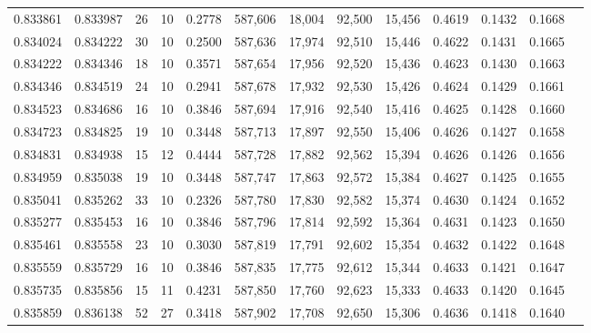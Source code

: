 \begin{tabular}{rrrrrrrrrrrrr}
0.833861 & 0.833987 &    26 &  10 &                                     0.2778 & 587,606 &  18,004 &  92,500 &  15,456 & 0.4619 & 0.1432 & 0.1668 \\
0.834024 & 0.834222 &    30 &  10 &                                     0.2500 & 587,636 &  17,974 &  92,510 &  15,446 & 0.4622 & 0.1431 & 0.1665 \\
0.834222 & 0.834346 &    18 &  10 &                                     0.3571 & 587,654 &  17,956 &  92,520 &  15,436 & 0.4623 & 0.1430 & 0.1663 \\
0.834346 & 0.834519 &    24 &  10 &                                     0.2941 & 587,678 &  17,932 &  92,530 &  15,426 & 0.4624 & 0.1429 & 0.1661 \\
0.834523 & 0.834686 &    16 &  10 &                                     0.3846 & 587,694 &  17,916 &  92,540 &  15,416 & 0.4625 & 0.1428 & 0.1660 \\
0.834723 & 0.834825 &    19 &  10 &                                     0.3448 & 587,713 &  17,897 &  92,550 &  15,406 & 0.4626 & 0.1427 & 0.1658 \\
0.834831 & 0.834938 &    15 &  12 &                                     0.4444 & 587,728 &  17,882 &  92,562 &  15,394 & 0.4626 & 0.1426 & 0.1656 \\
0.834959 & 0.835038 &    19 &  10 &                                     0.3448 & 587,747 &  17,863 &  92,572 &  15,384 & 0.4627 & 0.1425 & 0.1655 \\
0.835041 & 0.835262 &    33 &  10 &                                     0.2326 & 587,780 &  17,830 &  92,582 &  15,374 & 0.4630 & 0.1424 & 0.1652 \\
0.835277 & 0.835453 &    16 &  10 &                                     0.3846 & 587,796 &  17,814 &  92,592 &  15,364 & 0.4631 & 0.1423 & 0.1650 \\
0.835461 & 0.835558 &    23 &  10 &                                     0.3030 & 587,819 &  17,791 &  92,602 &  15,354 & 0.4632 & 0.1422 & 0.1648 \\
0.835559 & 0.835729 &    16 &  10 &                                     0.3846 & 587,835 &  17,775 &  92,612 &  15,344 & 0.4633 & 0.1421 & 0.1647 \\
0.835735 & 0.835856 &    15 &  11 &                                     0.4231 & 587,850 &  17,760 &  92,623 &  15,333 & 0.4633 & 0.1420 & 0.1645 \\
0.835859 & 0.836138 &    52 &  27 &                                     0.3418 & 587,902 &  17,708 &  92,650 &  15,306 & 0.4636 & 0.1418 & 0.1640 \\

\end{tabular}
